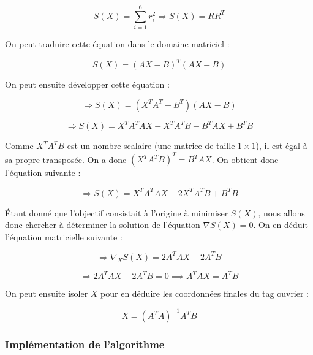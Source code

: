 \begin{equation}
   S(X) = \sum_{i=1}^{6} r_i^2 \Rightarrow S(X)=RR^T
\end{equation}

On peut traduire cette équation dans le domaine matriciel : 

\begin{equation}
   S(X)=(AX - B)^T (AX - B)
\end{equation}

On peut ensuite développer cette équation :

\begin{equation}
   \Rightarrow S(X) = (X^T A^T - B^T)(AX - B)
\end{equation}

\begin{equation}
   \Rightarrow S(X) = X^T A^T A X - X^T A^T B - B^T A X + B^T B
\end{equation}

Comme $X^T A^T B$ est un nombre scalaire (une matrice de taille $1 \times 1$), il est égal à sa propre transposée. On a donc $(X^T A^T B)^T = B^T A X$. On obtient donc l'équation suivante : 

\begin{equation}
   \Rightarrow S(X) = X^T A^T A X - 2 X^T A^T B + B^T B
\end{equation}

Étant donné que l'objectif consistait à l'origine à minimiser $S(X)$, nous allons donc chercher à déterminer la solution de l'équation $\nabla S(X)=0$. On en déduit l'équation matricielle suivante :

\begin{equation}
   \Rightarrow \nabla_X S(X) = 2 A^T A X - 2 A^T B
\end{equation}

\begin{equation}
   \Rightarrow 2 A^T A X - 2 A^T B = 0 \implies A^T A X = A^T B
\end{equation}

On peut ensuite isoler $X$ pour en déduire les coordonnées finales du tag ouvrier : 

\begin{equation}
   X = (A^T A)^{-1} A^T B
\end{equation}

\subsubsection{Implémentation de l'algorithme}

